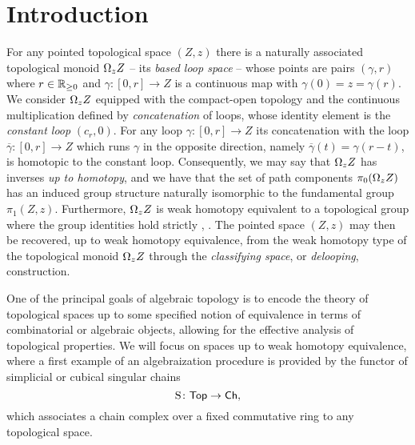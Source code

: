 
\section{Introduction}

For any pointed topological space $(Z,z)$ there is a naturally associated topological monoid $\Omega_z Z$ -- its \textit{based loop space} -- whose points are pairs $(\gamma, r)$ where $r \in \mathbb{R}_{\geq 0}$ and $\gamma \colon [0,r] \to Z$ is a continuous map with $\gamma(0) = z = \gamma(r)$.
We consider $\Omega_z Z$  equipped with the compact-open topology and the continuous multiplication defined by \textit{concatenation} of loops, whose identity element is the \textit{constant loop} $(c_r,0)$.
For any loop $\gamma \colon [0,r] \to Z $ its concatenation with the loop $\overline{\gamma} \colon [0,r] \to Z$ which runs $\gamma$ in the opposite direction, namely $\overline{\gamma}(t) = \gamma(r-t)$, is homotopic to the constant loop.
Consequently, we may say that $\Omega_z Z$ has inverses \textit{up to homotopy}, and we have that the set of path components $\pi_0(\Omega_z Z)$ has an induced group structure naturally isomorphic to the fundamental group $\pi_1(Z,z)$.
Furthermore, $\Omega_z Z$ is weak homotopy equivalent to a topological group where the group identities hold strictly \cite{milnor1956bundles}, \cite{berger1995loops}.
The pointed space $(Z,z)$ may then be recovered, up to weak homotopy equivalence, from the weak homotopy type of the topological monoid $\Omega_z Z$ through the \textit{classifying space}, or \textit{delooping}, construction.

One of the principal goals of algebraic topology is to encode the theory of topological spaces up to some specified notion of equivalence in terms of combinatorial or algebraic objects, allowing for the effective analysis of topological properties.
We will focus on spaces up to weak homotopy equivalence, where a first example of an algebraization procedure is provided by the functor of simplicial or cubical singular chains
\[
\operatorname{S} \colon \mathsf{Top} \to \mathsf{Ch},
\]
which associates a chain complex over a fixed commutative ring to any topological space.

